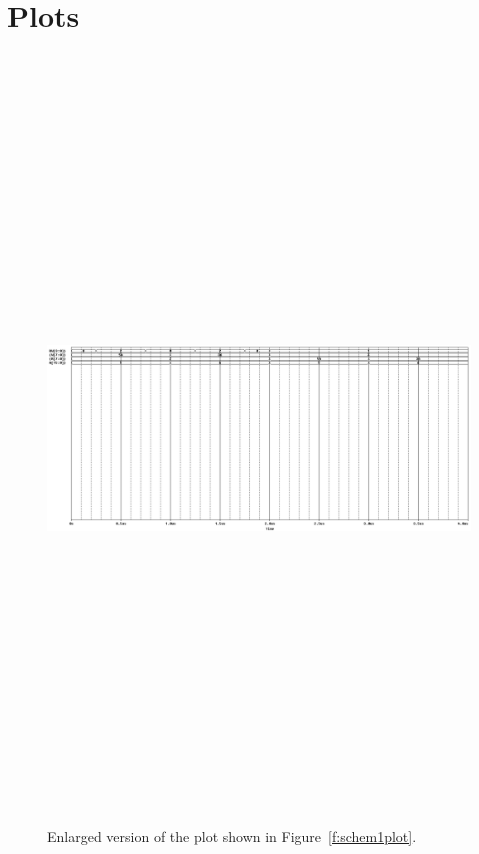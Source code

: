 \section{Plots}

\begin{figure}[H]
\centering
	\includegraphics[angle=90, height=8in]{img/shot/sim1_plot.png}
	\parbox{.8\textwidth}{
	\caption[Part 1 Simulation Results (Full Size)]{Enlarged
	version of the plot shown in Figure~\ref{f:schem1plot}.}
	\label{f:schem1plot_big}}
\end{figure}

